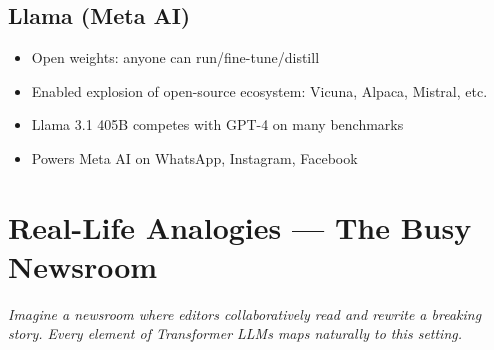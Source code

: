 \documentclass[11pt]{article}
\providecommand{\tightlist}{\setlength{\itemsep}{1pt}\setlength{\parskip}{0pt}}
\begin{document}
\subsection{Llama (Meta AI)}\label{llama-meta-ai}

\begin{itemize}
\tightlist
\item
  Open weights: anyone can run/fine-tune/distill
\item
  Enabled explosion of open-source ecosystem: Vicuna, Alpaca, Mistral, etc.
\item
  Llama 3.1 405B competes with GPT-4 on many benchmarks
\item
  Powers Meta AI on WhatsApp, Instagram, Facebook
\end{itemize}

\section{Real-Life Analogies --- The Busy Newsroom}\label{real-life-analogies--the-busy-newsroom}

\emph{Imagine a newsroom where editors collaboratively read and rewrite a breaking story. Every element of Transformer LLMs maps naturally to this setting.}
\end{document}
